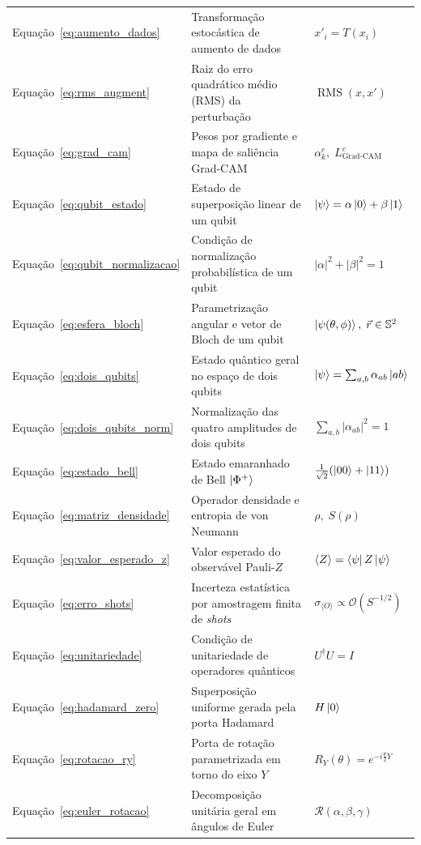 \documentclass[
    12pt,
    openright,
    oneside,
    a4paper,
    english,
    brazil
]{abntex2}
\begin{document}
\begin{longtable}{@{}p{2.9cm}p{7.8cm}p{\dimexpr\textwidth-10.7cm-4\tabcolsep\relax}@{}}
Equação~\eqref{eq:aumento_dados} & Transformação estocástica de aumento de dados & \(x'_i = T(x_i)\) \\
Equação~\eqref{eq:rms_augment} & Raiz do erro quadrático médio (RMS) da perturbação & \(\operatorname{RMS}(x,x')\) \\
Equação~\eqref{eq:grad_cam} & Pesos por gradiente e mapa de saliência Grad-CAM & \(\alpha_k^c,\; L_{\text{Grad-CAM}}^c\) \\
Equação~\eqref{eq:qubit_estado} & Estado de superposição linear de um qubit & \(\ket{\psi} = \alpha\ket{0} + \beta\ket{1}\) \\
Equação~\eqref{eq:qubit_normalizacao} & Condição de normalização probabilística de um qubit & \(|\alpha|^2 + |\beta|^2 = 1\) \\
Equação~\eqref{eq:esfera_bloch} & Parametrização angular e vetor de Bloch de um qubit & \(\ket{\psi(\theta,\phi)},\; \vec{r} \in \mathbb{S}^2\) \\
Equação~\eqref{eq:dois_qubits} & Estado quântico geral no espaço de dois qubits & \(\ket{\psi} = \sum_{a,b}\alpha_{ab}\ket{ab}\) \\
Equação~\eqref{eq:dois_qubits_norm} & Normalização das quatro amplitudes de dois qubits & \(\sum_{a,b}|\alpha_{ab}|^2 = 1\) \\
Equação~\eqref{eq:estado_bell} & Estado emaranhado de Bell \(\ket{\Phi^+}\) & \(\frac{1}{\sqrt{2}}(\ket{00}+\ket{11})\) \\
Equação~\eqref{eq:matriz_densidade} & Operador densidade e entropia de von Neumann & \(\rho,\; S(\rho)\) \\
Equação~\eqref{eq:valor_esperado_z} & Valor esperado do observável Pauli-\(Z\) & \(\langle Z \rangle = \bra{\psi}Z\ket{\psi}\) \\
Equação~\eqref{eq:erro_shots} & Incerteza estatística por amostragem finita de \textit{shots} & \(\sigma_{\langle O\rangle} \propto \mathcal{O}(S^{-1/2})\) \\
Equação~\eqref{eq:unitariedade} & Condição de unitariedade de operadores quânticos & \(U^\dagger U = I\) \\
Equação~\eqref{eq:hadamard_zero} & Superposição uniforme gerada pela porta Hadamard & \(H\ket{0}\) \\
Equação~\eqref{eq:rotacao_ry} & Porta de rotação parametrizada em torno do eixo \(Y\) & \(R_Y(\theta) = e^{-i\frac{\theta}{2}Y}\) \\
Equação~\eqref{eq:euler_rotacao} & Decomposição unitária geral em ângulos de Euler & \(\mathcal{R}(\alpha,\beta,\gamma)\) \\

\end{longtable}
\end{document}
